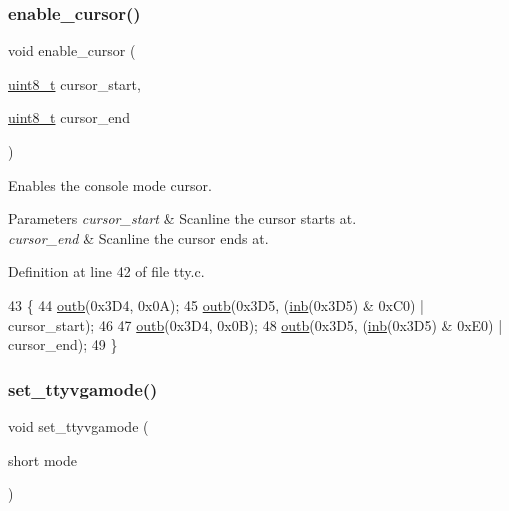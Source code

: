 \subsubsection{\texorpdfstring{enable\+\_\+cursor()}{enable\_cursor()}}
{\footnotesize\ttfamily void enable\+\_\+cursor (\begin{DoxyParamCaption}\item[{\hyperlink{a00134_aba7bc1797add20fe3efdf37ced1182c5_aba7bc1797add20fe3efdf37ced1182c5}{uint8\+\_\+t}}]{cursor\+\_\+start,  }\item[{\hyperlink{a00134_aba7bc1797add20fe3efdf37ced1182c5_aba7bc1797add20fe3efdf37ced1182c5}{uint8\+\_\+t}}]{cursor\+\_\+end }\end{DoxyParamCaption})}



Enables the console mode cursor. 


\begin{DoxyParams}{Parameters}
{\em cursor\+\_\+start} & Scanline the cursor starts at. \\
\hline
{\em cursor\+\_\+end} & Scanline the cursor ends at. \\
\hline
\end{DoxyParams}


Definition at line 42 of file tty.\+c.


\begin{DoxyCode}
43 \{
44     \hyperlink{a00158_aa37f5841c54156a4b14fc0d6f626b44f_aa37f5841c54156a4b14fc0d6f626b44f}{outb}(0x3D4, 0x0A);
45     \hyperlink{a00158_aa37f5841c54156a4b14fc0d6f626b44f_aa37f5841c54156a4b14fc0d6f626b44f}{outb}(0x3D5, (\hyperlink{a00158_a0223c8898dfec29069879dc51076e28a_a0223c8898dfec29069879dc51076e28a}{inb}(0x3D5) & 0xC0) | cursor\_start);
46  
47     \hyperlink{a00158_aa37f5841c54156a4b14fc0d6f626b44f_aa37f5841c54156a4b14fc0d6f626b44f}{outb}(0x3D4, 0x0B);
48     \hyperlink{a00158_aa37f5841c54156a4b14fc0d6f626b44f_aa37f5841c54156a4b14fc0d6f626b44f}{outb}(0x3D5, (\hyperlink{a00158_a0223c8898dfec29069879dc51076e28a_a0223c8898dfec29069879dc51076e28a}{inb}(0x3D5) & 0xE0) | cursor\_end);
49 \}
\end{DoxyCode}
\mbox{\label{a00170_aaf55ee008e2e63ca97eacae371646db7_aaf55ee008e2e63ca97eacae371646db7}} 
\subsubsection{\texorpdfstring{set\+\_\+ttyvgamode()}{set\_ttyvgamode()}}
{\footnotesize\ttfamily void set\+\_\+ttyvgamode (\begin{DoxyParamCaption}\item[{short}]{mode }\end{DoxyParamCaption})}



